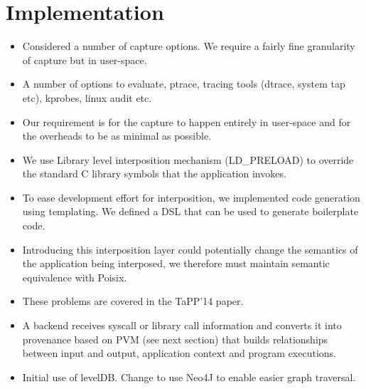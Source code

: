 \documentclass[withindex,glossary]{cam-thesis}
\begin{document}




\section{Implementation}
\begin{itemize}
\item Considered a number of capture options. We require a fairly fine granularity of capture but in user-space.
\item A number of options to evaluate, ptrace, tracing tools (dtrace, system tap etc), kprobes, linux audit etc.
\item Our requirement is for the capture to happen entirely in user-space and for the overheads to be as minimal as possible.
\item We use Library level interposition mechanism (LD\_PRELOAD) to override the standard C library symbols that the application invokes.
\item To ease development effort for interposition, we implemented code generation using templating. We defined a DSL that can be used to generate boilerplate code.
\item Introducing this interposition layer could potentially change the semantics of the application being interposed, we therefore must maintain semantic equivalence with Poisix.
\item These problems are covered in the TaPP'14 paper.
\item A backend receives syscall or library call information and converts it into provenance based on PVM (see next section) that builds relationships between input and output, application context and program executions.
\item Initial use of levelDB. Change to use Neo4J to enable easier graph traversal.
\end{itemize}
\end{document}
